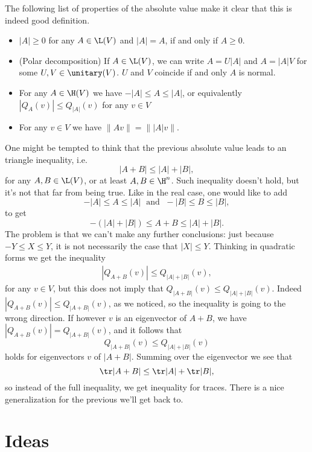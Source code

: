 The following list of properties of the absolute value make it clear that this is indeed good definition.

\begin{itemize}
	\item $|A| \geq 0$ for any $A \in \L(V)$ and $|A| = A$, if and only if $A \geq 0$.
	\item (Polar decomposition) If $A \in \L(V)$, we can write $A = U |A|$ and $A = |A| V$ for some $U, V \in \unitary(V)$. $U$ and $V$ coincide if and only $A$ is normal.
	\item For any $A \in \H(V)$ we have $-|A| \leq A \leq |A|$, or equivalently $|Q_{A}(v)| \leq Q_{|A|}(v)$ for any $v \in V$
	\item For any $v \in V$ we have $\|A v\| = \||A|v\|$.
\end{itemize}

One might be tempted to think that the previous absolute value leads to an triangle inequality, i.e.
\[
	|A + B| \leq |A| + |B|,
\]
for any $A, B \in \L(V)$, or at least $A, B \in \H^{n}$. Such inequality doesn't hold, but it's not that far from being true. Like in the real case, one would like to add
\[
	-|A| \leq A \leq |A| \; \text{ and } \; -|B| \leq B \leq |B|,
\]
to get
\[
	-(|A| + |B|) \leq A + B \leq |A| + |B|.
\]
The problem is that we can't make any further conclusions: just because $-Y \leq X \leq Y$, it is not necessarily the case that $|X| \leq Y$. Thinking in quadratic forms we get the inequality
\begin{align}
	|Q_{A + B}(v)| \leq Q_{|A| + |B|}(v),
\end{align}
for any $v \in V$, but this does not imply that $Q_{|A + B|}(v) \leq Q_{|A| + |B|}(v)$. Indeed $|Q_{A + B}(v)| \leq Q_{|A + B|}(v)$, as we noticed, so the inequality is going to the wrong direction. If however $v$ is an eigenvector of $A + B$, we have $|Q_{A + B}(v)| = Q_{|A + B|}(v)$, and it follows that
\[
	Q_{|A + B|}(v) \leq Q_{|A| + |B|}(v)
\]
holds for eigenvectors $v$ of $|A + B|$. Summing over the eigenvector we see that
\[
	\tr|A + B| \leq \tr |A| + \tr |B|,
\]
so instead of the full inequality, we get inequality for traces. There is a nice generalization for the previous we'll get back to.

\section{Ideas}

